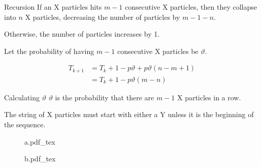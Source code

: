 \documentclass[xcolor={usenames,dvipsnames}]{beamer}
\begin{document}
\begin{frame}{Recursion}
  If an X particles hits $m-1$ consecutive X particles, then they collapse into $n$ X particles, decreasing the number of particles by $m-1-n$.

  Otherwise, the number of particles increases by 1.

  Let the probability of having  $m-1$ consecutive X particles be $\vartheta$. 

  \begin{align*}
    T_{k+1} &= T_k + 1-p\vartheta + p\vartheta(n-m+1) \\
            &= T_k + 1 - p\vartheta(m - n)
  \end{align*}
\end{frame}
\begin{frame}{Calculating $\vartheta$}
  $\vartheta$ is the probability that there are $m-1$ X particles in a row.

  The string of X particles must start with either a Y unless it is the beginning of the sequence. 
  \vspace{1cm}
\begin{center}
  \begin{figure}[ht]
    \centering
    \def\svgwidth{0.6\textwidth}
    {a.pdf_tex}
\end{figure}
  \begin{figure}[ht]
    \centering
    \def\svgwidth{0.6\textwidth}
    {b.pdf_tex}
  \end{figure}
\end{center}

\end{frame}
\end{document}
